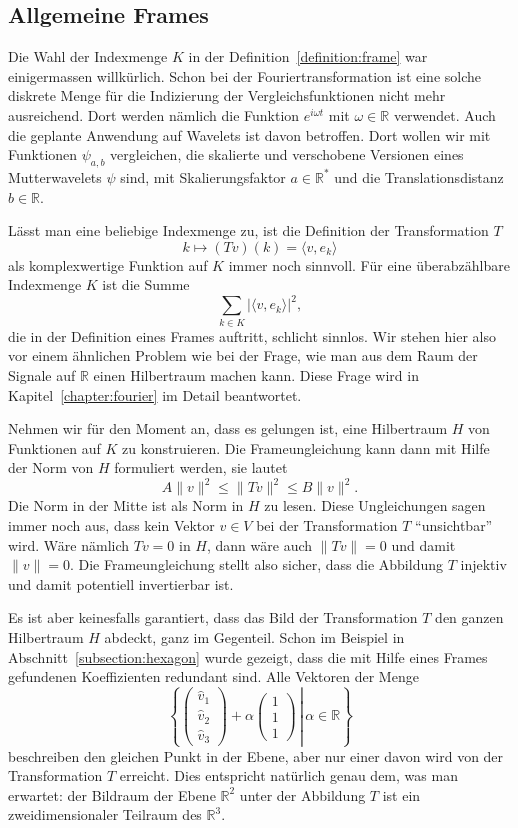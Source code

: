 %
%
\subsection{Allgemeine Frames}
Die Wahl der Indexmenge $K$ in der Definition~\ref{definition:frame}
war einigermassen willkürlich.
Schon bei der Fouriertransformation ist eine solche diskrete Menge
für die Indizierung der Vergleichsfunktionen nicht mehr ausreichend.
Dort werden nämlich die Funktion $e^{i\omega t}$ mit $\omega\in\mathbb R$
verwendet.
Auch die geplante Anwendung auf Wavelets ist davon betroffen.
Dort wollen wir mit Funktionen $\psi_{a,b}$ vergleichen, die 
skalierte und verschobene Versionen eines Mutterwavelets $\psi$ sind,
mit Skalierungsfaktor $a\in\mathbb R^*$ und die Translationsdistanz
$b\in \mathbb R$.
%
%

Lässt man eine beliebige Indexmenge zu, ist die Definition der
Transformation $T$
\[
k
\mapsto
(Tv)(k) = \langle v,e_k\rangle
\]
als komplexwertige Funktion auf $K$ immer noch sinnvoll.
Für eine überabzählbare Indexmenge $K$ ist die Summe 
\[
\sum_{k\in K} |\langle v,e_k\rangle|^2,
\]
die in der Definition eines Frames auftritt, schlicht sinnlos.
Wir stehen hier also vor einem ähnlichen Problem wie bei der Frage,
wie man aus dem Raum der Signale auf $\mathbb R$ einen Hilbertraum machen kann.
Diese Frage wird in Kapitel~\ref{chapter:fourier} im Detail beantwortet.

Nehmen wir für den Moment an, dass es gelungen ist, eine Hilbertraum $H$
von Funktionen auf $K$ zu konstruieren.
Die Frameungleichung kann dann mit Hilfe der Norm von $H$ formuliert
werden, sie lautet
\[
A\|v\|^2 \le \|Tv\|^2 \le B\|v\|^2.
\]
Die Norm in der Mitte ist als Norm in $H$ zu lesen.
Diese Ungleichungen sagen immer noch aus, dass kein Vektor $v\in V$ bei
der Transformation $T$ ``unsichtbar'' wird.
Wäre nämlich $Tv=0$ in $H$, dann wäre auch $\|Tv\|=0$ und damit
$\|v\|=0$.
Die Frameungleichung stellt also sicher, dass die Abbildung $T$ 
injektiv und damit potentiell invertierbar ist.

Es ist aber keinesfalls garantiert, dass das Bild der Transformation $T$
den ganzen Hilbertraum $H$ abdeckt, ganz im Gegenteil.
Schon im Beispiel in Abschnitt~\ref{subsection:hexagon} wurde gezeigt,
dass die mit Hilfe eines Frames gefundenen Koeffizienten redundant sind.
Alle Vektoren der Menge
\[
\left\{
\left.
\begin{pmatrix}\hat{v}_1\\\hat{v}_2\\\hat{v}_3\end{pmatrix}
+\alpha\begin{pmatrix}1\\1\\1\end{pmatrix}
\,
\right|\,
\alpha \in\mathbb R
\right\}
\]
beschreiben den gleichen Punkt in der Ebene, aber nur einer davon 
wird von der Transformation $T$ erreicht.
Dies entspricht natürlich genau dem, was man erwartet: der Bildraum
der Ebene $\mathbb R^2$ unter der Abbildung $T$ ist ein zweidimensionaler
Teilraum des $\mathbb R^3$.

